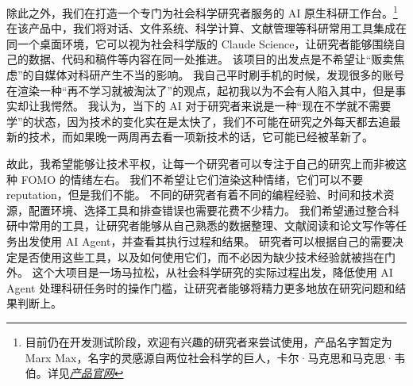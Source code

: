 

除此之外，我们在打造一个专门为社会科学研究者服务的 AI 原生科研工作台。\footnote{目前仍在开发测试阶段，欢迎有兴趣的研究者来尝试使用，产品名字暂定为 Marx Max，名字的灵感源自两位社会科学的巨人，卡尔·马克思和马克思·韦伯。详见\href{https://marx-max.aidea-labs.com/?source_utm=econ-sbm-template}{\underline{\textit{产品官网}}}}
在该产品中，我们将对话、文件系统、科学计算、文献管理等科研常用工具集成在同一个桌面环境，它可以视为社会科学版的 Claude Science，让研究者能够围绕自己的数据、代码和稿件等内容在同一处推进。
该项目的出发点是不希望让“贩卖焦虑”的自媒体对科研产生不当的影响。
我自己平时刷手机的时候，发现很多的账号在渲染一种“再不学习就被淘汰了”的观点，起初我以为不会有人陷入其中，但是事实却让我愕然。
我认为，当下的 AI 对于研究者来说是一种“现在不学就不需要学”的状态，因为技术的变化实在是太快了，我们不可能在研究之外每天都去追最新的技术，而如果晚一两周再去看一项新技术的话，它可能已经被革新了。

故此，我希望能够让技术平权，让每一个研究者可以专注于自己的研究上而非被这种 FOMO 的情绪左右。
我们不希望让它们渲染这种情绪，它们可以不要 reputation，但是我们不能。
不同的研究者有着不同的编程经验、时间和技术资源，配置环境、选择工具和排查错误也需要花费不少精力。
我们希望通过整合科研中常用的工具，让研究者能够从自己熟悉的数据整理、文献阅读和论文写作等任务出发使用 AI Agent，并查看其执行过程和结果。
研究者可以根据自己的需要决定是否使用这些工具，以及如何使用它们，而不必因为缺少技术经验就被挡在门外。
这个大项目是一场马拉松，从社会科学研究的实际过程出发，降低使用 AI Agent 处理科研任务时的操作门槛，让研究者能够将精力更多地放在研究问题和结果判断上。
